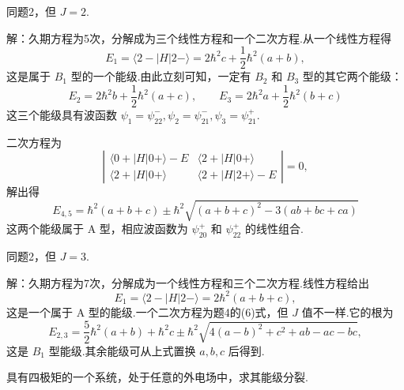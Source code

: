\begin{xiti}
\quad 同题2，但 $J=2$.

解：久期方程为5次，分解成为三个线性方程和一个二次方程.从一个线性方程得
\begin{equation}
  E_1=\langle 2-|H|2-\rangle=2\hbar^2c+\frac{1}{2}\hbar^2(a+b),
\end{equation}
这是属于 $B_1$ 型的一个能级.由此立刻可知，一定有 $B_2$ 和 $B_3$ 型的其它两个能级：
\begin{equation*}
  E_2=2\hbar^2b+\frac{1}{2}\hbar^2(a+c),\qquad
  E_3=2\hbar^2a+\frac{1}{2}\hbar^2(b+c)
\end{equation*}
这三个能级具有波函数 $\psi_1=\psi^-_{22},\psi_2=\psi^-_{21},\psi_3=\psi^+_{21}$.

二次方程为
\begin{equation}
  \left|\begin{array}{cc}
    \langle 0+|H|0+\rangle-E & \langle 2+|H|0+\rangle\\
    \langle 2+|H|0+\rangle & \langle 2+|H|2+\rangle-E
  \end{array}\right|=0,
\end{equation}
解出得
\begin{equation}
  E_{4,5}=\hbar^2(a+b+c)\pm\hbar^2
  \sqrt{(a+b+c)^2-3(ab+bc+ca)}
\end{equation}
这两个能级属于 A 型，相应波函数为 $\psi^+_{20}$ 和 $\psi^+_{22}$ 的线性组合.

\quad 同题2，但 $J=3$.

解：久期方程为7次，分解成为一个线性方程和三个二次方程.线性方程给出
\begin{equation}
  E_1=\langle 2-|H|2-\rangle=2\hbar^2(a+b+c),
\end{equation}
这是一个属于 A 型的能级.一个二次方程为题4的(6)式，但 $J$ 值不一样.它的根为
\begin{equation}
  E_{2,3}=\frac{5}{2}\hbar^2(a+b)+\hbar^2c
  \pm\hbar^2\sqrt{4(a-b)^2+c^2+ab-ac-bc},
\end{equation}
这是 $B_1$ 型能级.其余能级可从上式置换 $a,b,c$ 后得到.

\quad 具有四极矩的一个系统，处于任意的外电场中，求其能级分裂.


\end{xiti}
